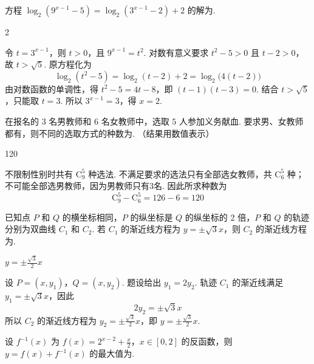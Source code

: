 \begin{problem}
方程 \(\log_2(9^{x - 1} - 5) = \log_2(3^{x - 1} - 2) + 2\) 的解为\fillinblank{}.
\end{problem}

\begin{answer}
2
\end{answer}

\begin{solution}
令 \(t=3^{x-1}\)，则 \(t>0\)，且 \(9^{x-1}=t^2\). 对数有意义要求 \(t^2-5>0\) 且 \(t-2>0\)，故 \(t>\sqrt5\). 原方程化为
\[
\log_2(t^2-5)=\log_2(t-2)+2=\log_2\bigl(4(t-2)\bigr)
\]
由对数函数的单调性，得 \(t^2-5=4t-8\)，即 \((t-1)(t-3)=0\). 结合 \(t>\sqrt5\)，只能取 \(t=3\). 所以 \(3^{x-1}=3\)，得 \(x=2\).
\end{solution}

\begin{problem}
在报名的 \(3\) 名男教师和 \(6\) 名女教师中，选取 \(5\) 人参加义务献血. 要求男、女教师都有，则不同的选取方式的种数为\fillinblank{}. （结果用数值表示）
\end{problem}

\begin{answer}
120
\end{answer}

\begin{solution}
不限制性别时共有 \(\mathrm C_9^5\) 种选法. 不满足要求的选法只有全部选女教师，共 \(\mathrm C_6^5\) 种；不可能全部选男教师，因为男教师只有3名. 因此所求种数为
\[
\mathrm C_9^5-\mathrm C_6^5=126-6=120
\]
\end{solution}

\begin{problem}
已知点 \(P\) 和 \(Q\) 的横坐标相同，\(P\) 的纵坐标是 \(Q\) 的纵坐标的 2 倍，\(P\) 和 \(Q\) 的轨迹分别为双曲线 \(C_1\) 和 \(C_2\). 若 \(C_1\) 的渐近线方程为 \(y = \pm \sqrt{3} x\)，则 \(C_2\) 的渐近线方程为\fillinblank{}.
\end{problem}

\begin{answer}
\(y=\pm\frac{\sqrt{3}}{2}x\)
\end{answer}

\begin{solution}
设 \(P=(x,y_1)\)，\(Q=(x,y_2)\). 题设给出 \(y_1=2y_2\). 轨迹 \(C_1\) 的渐近线满足 \(y_1=\pm\sqrt3 x\)，因此
\[
2y_2=\pm\sqrt3 x
\]
所以 \(C_2\) 的渐近线方程为 \(y_2=\pm\frac{\sqrt3}{2}x\)，即 \(y=\pm\frac{\sqrt3}{2}x\).
\end{solution}

\begin{problem}
设 \( f^{-1}(x) \) 为 \(f(x) = 2^{x - 2} + \frac{x}{2}\)，\(x \in [0,2]\) 的反函数，则 \( y = f(x) + f^{-1}(x) \) 的最大值为\fillinblank{}.
\end{problem}

